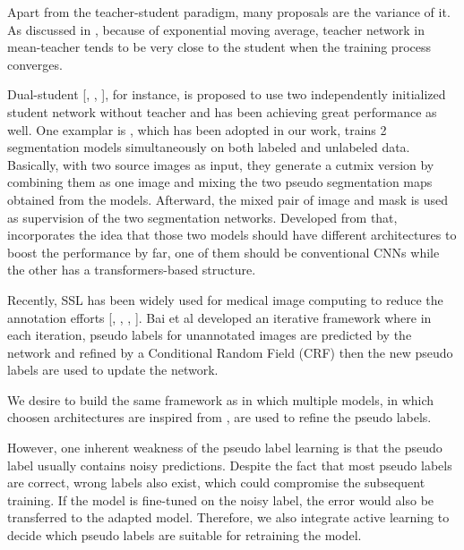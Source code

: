 Apart from the teacher-student paradigm, many proposals are the variance of it. As discussed in \cite{ke2019dualstudent}, because of exponential moving average, teacher network in mean-teacher tends to be very close to the student when the training process converges.

Dual-student [\cite{hang2020localnglobal}, \cite{ke2020guided}, \cite{cao2022adversarial}], for instance, is proposed to use two independently initialized student network without teacher and has been achieving great performance as well. One examplar is \cite{chen2021semisupervised}, which has been adopted in our work, trains 2 segmentation models simultaneously on both labeled and unlabeled data. Basically, with two source images as input, they generate a cutmix version by combining them as one image and mixing the two pseudo segmentation maps obtained from the models. Afterward, the mixed pair of image and mask is used as supervision of the two segmentation networks. 
Developed from that, \cite{luo2021semisupervised} incorporates the idea that those two models should have different architectures to boost the performance by far, one of them should be conventional CNNs while the other has a transformers-based structure. 

Recently, SSL has been widely used for medical image computing to reduce the
annotation efforts [\cite{hang2020localnglobal}, \cite{li2020transformation}, \cite{ma2020active}, \cite{peng2020mutual}]. Bai et al \cite{bai2017semisupervised} developed an iterative framework where in each iteration, pseudo labels for unannotated images are predicted by the network
and refined by a Conditional Random Field (CRF) then the new pseudo labels are used
to update the network. 

We desire to build the same framework as \cite{bai2017semisupervised} in which multiple models, in which choosen architectures are inspired from \cite{luo2021semisupervised}, are used to refine the pseudo labels. 

However, one inherent weakness of the pseudo label learning is that the pseudo label usually contains noisy predictions. Despite the fact that most pseudo labels are correct, wrong labels also exist, which could compromise the subsequent training. If the model is fine-tuned on the noisy label, the error would also be transferred to the
adapted model. Therefore, we also integrate active learning to decide which pseudo labels are suitable for retraining the	 model.